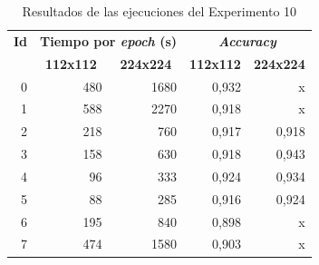 \begin{table}[h]
\caption{Resultados de las ejecuciones del Experimento 10}
\label{tab:exp10_resultado}
\centering
\begin{tabular}{r|r|r|rr}
\toprule
\multicolumn{1}{c|}{\textbf{Id}} & \multicolumn{2}{c|}{\textbf{Tiempo por \textit{epoch} (s)}}                            & \multicolumn{2}{c}{\textbf{\textit{Accuracy}}}                                        \\
\multicolumn{1}{c|}{\textbf{}}   & \multicolumn{1}{c|}{\textbf{112x112}} & \multicolumn{1}{c|}{\textbf{224x224}} & \multicolumn{1}{c|}{\textbf{112x112}} & \multicolumn{1}{c}{\textbf{224x224}} \\ \hline
0                                & 480                                   & 1680                                  & \multicolumn{1}{r|}{0,932}            & x                                    \\
1                                & 588                                   & 2270                                  & \multicolumn{1}{r|}{0,918}            & x                                    \\
2                                & 218                                   & 760                                   & \multicolumn{1}{r|}{0,917}            & 0,918
                                    \\
3                                & 158                                   & 630                                   & \multicolumn{1}{r|}{0,918}            & 0,943                                    \\
4                                & 96                                    & 333                                   & \multicolumn{1}{r|}{0,924}            & 0,934                                    \\
5                                & 88                                    & 285                                   & \multicolumn{1}{r|}{0,916}            & 0,924
                                    \\
6                                & 195                                   & 840                                   & \multicolumn{1}{r|}{0,898}            & x                                    \\
7                                & 474                                   & 1580                                  & \multicolumn{1}{r|}{0,903}            & x       \\
\bottomrule
\end{tabular}
\end{table}

